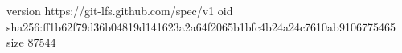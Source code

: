 version https://git-lfs.github.com/spec/v1
oid sha256:ff1b62f79d36b04819d141623a2a64f2065b1bfc4b24a24c7610ab9106775465
size 87544
